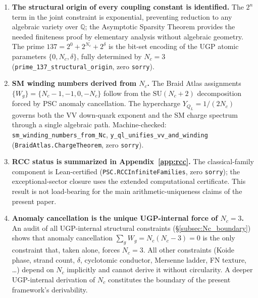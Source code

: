 \documentclass[11pt]{article}
\theoremstyle{remark}
\newcommand{\Nc}{N_c}
\newcommand{\ddelta}{\delta}
\begin{document}
\begin{enumerate}[leftmargin=2em]
  \item \textbf{The structural origin of every coupling constant is identified.}
    The $2^n$ term in the joint constraint is exponential, preventing reduction to
    any algebraic variety over $\mathbb{Q}$; the Asymptotic Sparsity Theorem provides
    the needed finiteness proof by elementary analysis without algebraic geometry.
    The prime $137 = 2^0 + 2^{\Nc} + 2^{\ddelta}$ is the bit-set encoding of the UGP
    atomic parameters $\{0, \Nc, \ddelta\}$, fully determined by $\Nc = 3$
    (\texttt{prime\_137\_structural\_origin}, zero \texttt{sorry}).

  \item \textbf{SM winding numbers derived from $\Nc$.}
    The Braid Atlas assignments $\{W_g\} = \{\Nc{-}1,-1,0,-\Nc\}$ follow from
    the $\mathrm{SU}(\Nc+2)$ decomposition forced by PSC anomaly cancellation.
    The hypercharge $Y_{Q_L} = 1/(2\Nc)$ governs both the VV down-quark exponent
    and the SM charge spectrum through a single algebraic path.
    Machine-checked: \texttt{sm\_winding\_numbers\_from\_Nc},
    \texttt{y\_ql\_unifies\_\allowbreak vv\_and\_winding}
    (\texttt{BraidAtlas.\allowbreak ChargeTheorem}, zero \texttt{sorry}).

  \item \textbf{RCC status is summarized in Appendix~\ref{app:rcc}.}
    The classical-family component is Lean-certified (\texttt{PSC.RCCInfiniteFamilies}, zero \texttt{sorry});
    the exceptional-sector closure uses the extended computational certificate.
    This result is not load-bearing for the main arithmetic-uniqueness claims of the present paper.

  \item \textbf{Anomaly cancellation is the unique UGP-internal force of $\Nc = 3$.}
    An audit of all UGP-internal structural constraints
    (\S\ref{subsec:Nc_boundary}) shows that anomaly cancellation
    $\sum_g W_g = \Nc(\Nc{-}3) = 0$ is the only constraint that, taken alone,
    forces $\Nc = 3$.  All other constraints (Koide phase, strand count,
    $\delta$, cyclotomic conductor, Mersenne ladder, FN texture, \ldots) depend
    on $\Nc$ implicitly and cannot derive it without circularity.
    A deeper UGP-internal derivation of $\Nc$ constitutes the boundary of the
    present framework's derivability.


\end{enumerate}
\end{document}

